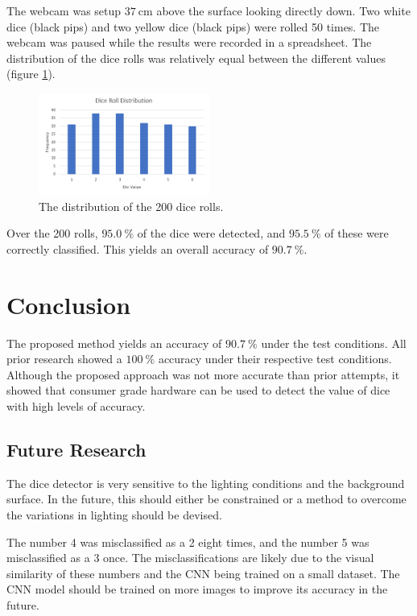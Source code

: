 \documentclass[conference]{IEEEtran}
\begin{document}
The webcam was setup $\SI{37}{\centi\metre}$ above the surface looking directly down. 
Two white dice (black pips) and two yellow dice (black pips) were rolled 50 times.
The webcam was paused while the results were recorded in a spreadsheet.
The distribution of the dice rolls was relatively equal between the different values (figure \ref{fig:results}).
\begin{figure}[H]
	\centering
	\includegraphics[width=0.5\textwidth]{results}
	\caption{The distribution of the 200 dice rolls.}
	\label{fig:results}
\end{figure}

Over the 200 rolls, $\SI{95.0}{\percent}$ of the dice were detected, and $\SI{95.5}{\percent}$ of these were correctly classified.
This yields an overall accuracy of $\SI{90.7}{\percent}$.

\section{Conclusion}

The proposed method yields an accuracy of $\SI{90.7}{\percent}$ under the test conditions.
All prior research showed a $\SI{100}{\percent}$ accuracy under their respective test conditions.
Although the proposed approach was not more accurate than prior attempts, it showed that consumer grade hardware can be used to detect the value of dice with high levels of accuracy.

\subsection{Future Research}

The dice detector is very sensitive to the lighting conditions and the background surface.
In the future, this should either be constrained or a method to overcome the variations in lighting should be devised.

The number 4 was misclassified as a 2 eight times, and the number 5 was misclassified as a 3 once.
The misclassifications are likely due to the visual similarity of these numbers and the CNN being trained on a small dataset. 
The CNN model should be trained on more images to improve its accuracy in the future.

\printbibliography
\end{document}
